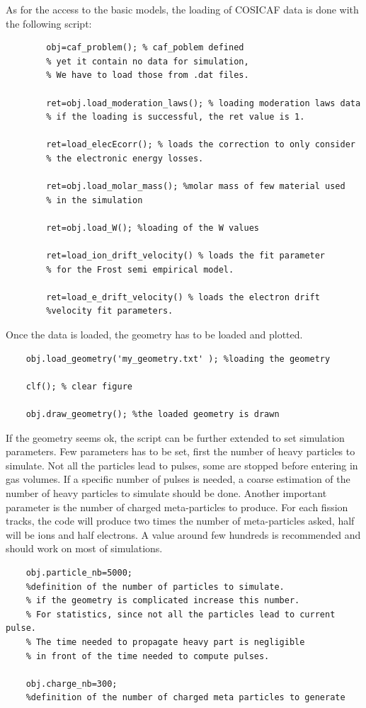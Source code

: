 \documentclass[10pt]{article}
\begin{document}
	
	As for the access to the basic models, the loading of COSICAF data is done with the following script:
	
	\begin{lstlisting}
		obj=caf_problem(); % caf_poblem defined
		% yet it contain no data for simulation,
		% We have to load those from .dat files.
		
		ret=obj.load_moderation_laws(); % loading moderation laws data
		% if the loading is successful, the ret value is 1.
		
		ret=load_elecEcorr(); % loads the correction to only consider
		% the electronic energy losses.
		
		ret=obj.load_molar_mass(); %molar mass of few material used 
		% in the simulation
		
		ret=obj.load_W(); %loading of the W values
		
		ret=load_ion_drift_velocity() % loads the fit parameter
		% for the Frost semi empirical model.
		
		ret=load_e_drift_velocity() % loads the electron drift
		%velocity fit parameters.
	\end{lstlisting}
	
	
	Once the data is loaded, the geometry has to be loaded and plotted.
	
	\begin{lstlisting}
	obj.load_geometry('my_geometry.txt' ); %loading the geometry
	
	clf(); % clear figure
	
	obj.draw_geometry(); %the loaded geometry is drawn
	\end{lstlisting}
	
	If the geometry seems ok, the script can be further extended to set 
	simulation parameters. Few parameters has to be set, first the number of heavy particles to simulate. Not all the particles lead to pulses, some are stopped before entering in gas volumes. If a specific number of pulses is needed, a coarse estimation of the number of heavy particles to simulate should be done. Another important parameter is the number of charged meta-particles to produce. For each fission tracks, the code will produce two times the number of meta-particles asked, half will be ions and half electrons. A value around few hundreds is recommended and should work on most of simulations. 
	
	\begin{lstlisting}
	obj.particle_nb=5000;
	%definition of the number of particles to simulate.
	% if the geometry is complicated increase this number.
	% For statistics, since not all the particles lead to current pulse.
	% The time needed to propagate heavy part is negligible
	% in front of the time needed to compute pulses.
	
	obj.charge_nb=300;
	%definition of the number of charged meta particles to generate
	\end{lstlisting}
	
\end{document}
